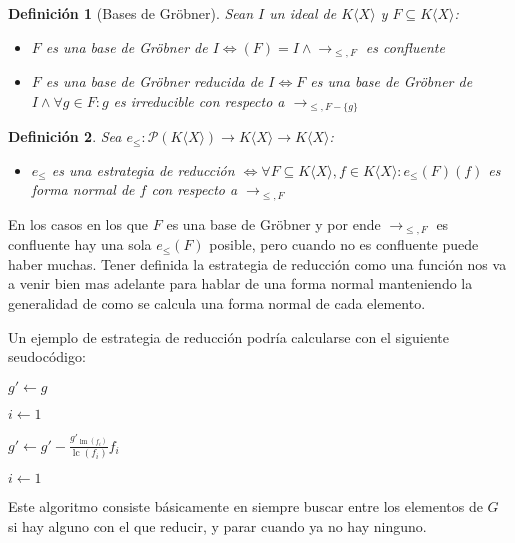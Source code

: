 \documentclass{amsbook} %
\theoremstyle{customstyle}
\newtheorem{definition}{Definición}[chapter]
\theoremstyle{factstyle}
\DeclareMathOperator{\sop}{sop}
\DeclareMathOperator{\lm}{lm}
\DeclareMathOperator{\lc}{lc}
\begin{document}
\begin{definition}[Bases de Gröbner]\label{def:base de Gröbner}
Sean $I$ un ideal de $K⟨X⟩$ y $F ⊆ K⟨X⟩$:
\begin{itemize}
\item $F$ es una base de Gröbner de $I ⇔ (F) = I ∧ →_{≤, F}$ es confluente
\item $F$ es una base de Gröbner reducida de $I ⇔ F$ es una base de Gröbner de $I ∧ ∀g ∈ F : g$ es irreducible con respecto a $→_{≤, F - \{g\}}$
\end{itemize}
\end{definition}

\begin{definition}
Sea $e_≤ : 𝒫(K⟨X⟩) → K⟨X⟩ → K⟨X⟩$:
\begin{itemize}
\item $e_≤$ es una estrategia de reducción $⇔ ∀F ⊆ K⟨X⟩, f ∈ K⟨X⟩ : e_≤(F)(f)$ es forma normal de $f$ con respecto a $→_{≤, F}$
\end{itemize}
\end{definition}

En los casos en los que $F$ es una base de Gröbner y por ende $→_{≤, F}$ es confluente hay una sola $e_≤(F)$ posible, pero cuando no es confluente puede haber muchas. Tener definida la estrategia de reducción como una función nos va a venir bien mas adelante para hablar de una forma normal manteniendo la generalidad de como se calcula una forma normal de cada elemento.

Un ejemplo de estrategia de reducción podría calcularse con el siguiente seudocódigo:

\begin{algorithm}[H] %
  \caption{Ejemplo de estrategia de reducción}\label{alg:estrategia de reducción}
  $g' ← g$

  $i ← 1$

   {
     {
      \If{$f_i ∈ \sop(g')$} {
        $g' ← g' - \frac{g'_{\lm(f_i)}}{\lc(f_i)}f_i$

        $i ← 1$

        \Break
      }
    }
  }
\end{algorithm}

Este algoritmo consiste básicamente en siempre buscar entre los elementos de $G$ si hay alguno con el que reducir, y parar cuando ya no hay ninguno.
\end{document}
